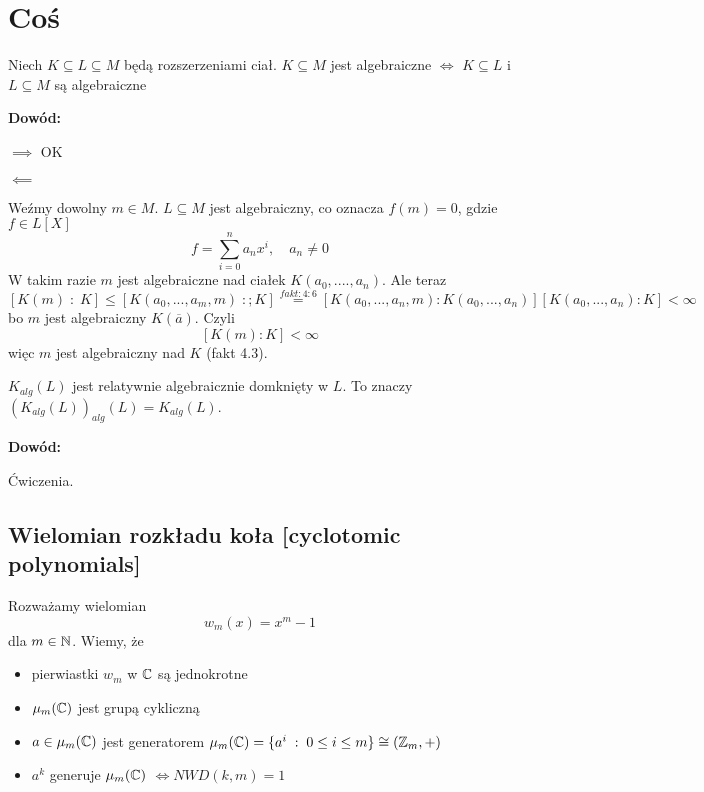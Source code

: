 
\section{Coś}

\begin{wniosek}
        Niech $K\subseteq L\subseteq M$ będą rozszerzeniami ciał. $K\subseteq M$ jest algebraiczne $\iff$ $K\subseteq L$ i $L\subseteq M$ są algebraiczne
\end{wniosek}

\textbf{Dowód:}

$\implies$ OK

$\impliedby$

Weźmy dowolny $m\in M$. $L\subseteq M$ jest algebraiczny, co oznacza $f(m)=0$, gdzie $f\in L[X]$
$$f=\sum\limits_{i=0}^na_nx^i,\quad a_n\neq 0$$
W takim razie $m$ jest algebraiczne nad ciałek $K(a_0,....,a_n)$. Ale teraz
$$[K(m)\;:\;K]\leq [K(a_0,...,a_m,m)\;:;K]\overset{fakt:4:6}{=}[K(a_0,...,a_n,m):K(a_0,...,a_n)][K(a_0,...,a_n):K]<\infty$$
bo $m$ jest algebraiczny $K(\overline a)$. Czyli
$$[K(m):K]<\infty$$
więc $m$ jest algebraiczny nad $K$ (fakt 4.3).

\begin{wniosek}[$(K_{alg}(L))_{alg}(L)=K_{alg}(L)$]
    $K_{alg}(L)$ jest relatywnie algebraicznie domknięty w $L$. To znaczy $(K_{alg}(L))_{alg}(L)=K_{alg}(L)$. 
\end{wniosek}

\textbf{Dowód:}

Ćwiczenia.

\subsection{Wielomian rozkładu koła [cyclotomic polynomials]}

Rozważamy wielomian
$$w_m(x)=x^m-1$$
dla $m\in\mathbb{N}$. Wiemy, że
\begin{itemize}
    \item[\point] pierwiastki $w_m$ w $\mathbb{C}$ są jednokrotne
    \item[\point] $\mu_m(\mathbb{C})$ jest grupą cykliczną
    \item[\point] $a\in\mu_m(\mathbb{C})$ jest generatorem $\mu_m(\mathbb{C})=\{a^i\;:\;0\leq i\leq m\}\cong(\mathbb{Z}_m,+)$
    \item[\point] $a^k$ generuje $\mu_m(\mathbb{C})$ $\iff NWD(k, m)=1$
\end{itemize}

